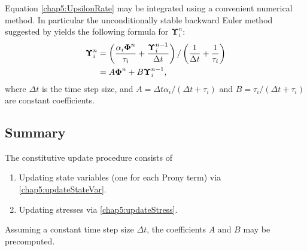 \bigskip

\noindent Equation \eqref{chap5:UpsilonRate} may be integrated using a convenient numerical method. In particular the unconditionally stable backward Euler method suggested by \cite{Poon98} yields the following formula for $ \boldsymbol \Upsilon_i^n $:
\begin{align}
\boldsymbol \Upsilon_i^n &= \left( \dfrac{\alpha_i \boldsymbol \Phi^n}{\tau_i} + \dfrac{\boldsymbol \Upsilon_i^{n-1}}{\Delta t} \right) / \left(\dfrac{1}{\Delta t} + \dfrac{1}{\tau_i} \right) \notag \\
&= A \boldsymbol \Phi^n + B \boldsymbol \Upsilon_i^{n-1}, \label{chap5:updateStateVar}
\end{align}
where $ \Delta t $ is the time step size, and $ A = \Delta t \alpha_i / (\Delta t + \tau_i) $ and $ B = \tau_i / (\Delta t + \tau_i) $ are constant coefficients. 
	
	\subsection{Summary}	
The constitutive update procedure consists of
\begin{enumerate}
\item Updating state variables (one for each Prony term) via \eqref{chap5:updateStateVar}.
\item Updating stresses via \eqref{chap5:updateStress}.
\end{enumerate}
Assuming a constant time step size $ \Delta t $, the coefficients $ A $ and $ B $ may be precomputed. 
